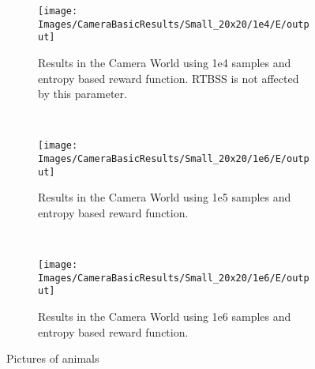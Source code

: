 \begin{figure}[h]
        \centering
        \begin{subfigure}[t]{0.3\textwidth}
                \texttt{[image: Images/CameraBasicResults/Small\_20x20/1e4/E/output]}
                \caption{Results in the Camera World using 1e4 samples and entropy based reward
                function. RTBSS is not affected by this parameter.}
                \label{fig:m4e}
        \end{subfigure}%
        ~ %
        \begin{subfigure}[t]{0.3\textwidth}
                \texttt{[image: Images/CameraBasicResults/Small\_20x20/1e6/E/output]}
                \caption{Results in the Camera World using 1e5 samples and entropy based reward
                function.}
                \label{fig:m5e}
        \end{subfigure}
        ~ %
        \begin{subfigure}[t]{0.3\textwidth}
                \texttt{[image: Images/CameraBasicResults/Small\_20x20/1e6/E/output]}
                \caption{Results in the Camera World using 1e6 samples and entropy based reward
                function.}
                \label{fig:m6e}
        \end{subfigure}
        \caption{Pictures of animals}\label{fig:me}
\end{figure}

